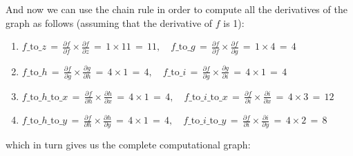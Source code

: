 \documentclass[12pt]{report}
\begin{document}
\noindent And now we can use the chain rule in order to compute all the derivatives of the graph as
follows (assuming that the derivative of $f$ is 1):
\begin{enumerate}
    \item $f\_\text{to}\_z \,=\, \frac{\partial f}{\partial f} \times \frac{\partial f}{\partial z}
                           \,=\, 1 \times 11 \,=\, 11,\quad
           f\_\text{to}\_g \,=\, \frac{\partial f}{\partial f} \times \frac{\partial f}{\partial g}
                           \,=\, 1 \times 4 \,=\, 4$
    
    \item $f\_\text{to}\_h \,=\, \frac{\partial f}{\partial g} \times \frac{\partial g}{\partial h}
                           \,=\, 4 \times 1 \,=\, 4,\quad
           f\_\text{to}\_i \,=\, \frac{\partial f}{\partial g} \times \frac{\partial g}{\partial i}
                           \,=\, 4 \times 1 \,=\, 4$

    \item $f\_\text{to}\_h\_\text{to}\_x \,=\, \frac{\partial f}{\partial h} \times \frac{\partial h}{\partial x}
                                         \,=\, 4 \times 1 \,=\, 4,\quad
           f\_\text{to}\_i\_\text{to}\_x \,=\, \frac{\partial f}{\partial i} \times \frac{\partial i}{\partial x}
                                         \,=\, 4 \times 3 \,=\, 12$

    \item $f\_\text{to}\_h\_\text{to}\_y \,=\, \frac{\partial f}{\partial h} \times \frac{\partial h}{\partial y}
                                         \,=\, 4 \times 1 \,=\, 4,\quad
           f\_\text{to}\_i\_\text{to}\_y \,=\, \frac{\partial f}{\partial i} \times \frac{\partial i}{\partial y}
                                         \,=\, 4 \times 2 \,=\, 8$
\end{enumerate}
which in turn gives us the complete computational graph:
\end{document}
